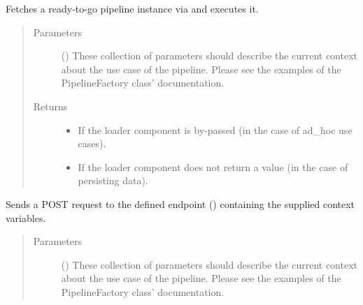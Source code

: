 \documentclass[a4paper,10pt, twoside,english]{sphinxmanual}
\begin{document}
\begin{fulllineitems}
\begin{fulllineitems}
\label{\detokenize{pipeline/pipeline_factory:spooq2.pipeline.factory.PipelineFactory.execute}}
Fetches a ready-to-go pipeline instance via {\hyperref[\detokenize{pipeline/pipeline_factory:spooq2.pipeline.factory.PipelineFactory.get_pipeline}]{}}
and executes it.
\begin{quote}\begin{description}
\item[{Parameters}] \leavevmode
{} () \textendash{} These collection of parameters should describe the current context about the use case
of the pipeline. Please see the examples of the PipelineFactory class’
documentation.

\item[{Returns}] \leavevmode
\begin{itemize}
\item {} 
 \textendash{} If the loader component is by-passed (in the case of ad\_hoc use cases).

\item {} 
 \textendash{} If the loader component does not return a value (in the case of persisting data).

\end{itemize}


\end{description}\end{quote}

\end{fulllineitems}


\begin{fulllineitems}
\label{\detokenize{pipeline/pipeline_factory:spooq2.pipeline.factory.PipelineFactory.get_metadata}}
Sends a POST request to the defined endpoint () containing the
supplied context variables.
\begin{quote}\begin{description}
\item[{Parameters}] \leavevmode
{} () \textendash{} These collection of parameters should describe the current context about the use case
of the pipeline. Please see the examples of the PipelineFactory class’
documentation.


\end{description}
\end{quote}
\end{fulllineitems}
\end{fulllineitems}
\end{document}
